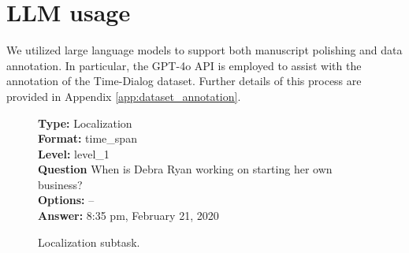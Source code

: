 \documentclass{article} %
\begin{document}




\section{LLM usage}
We utilized large language models to support both manuscript polishing and data annotation. In particular, the GPT-4o API is employed to assist with the annotation of the Time-Dialog dataset. Further details of this process are provided in Appendix \ref{app:dataset_annotation}.

\begin{figure}[htbp]
\begin{tcolorbox}[
colframe=black!75!white, 
colback=white, sharp corners, 
boxrule=0.8pt, width=\textwidth,
title=Localization
] 
\textbf{Type:} Localization \\
\textbf{Format:} time\_span \\
\textbf{Level:} level\_1 \\
\textbf{Question} When is Debra Ryan working on starting her own business? \\
\textbf{Options:} -- \\
\textbf{Answer:} 8:35 pm, February 21, 2020
\end{tcolorbox} 
\caption{Localization subtask.}
\label{fig:localization}
\end{figure}
\end{document}
